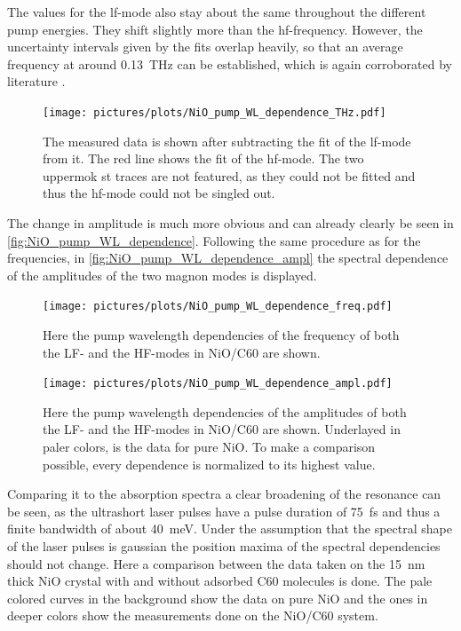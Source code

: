 The values for the lf-mode also stay about the same throughout the different pump energies.
They shift slightly more than the hf-frequency.
However, the uncertainty intervals given by the fits overlap heavily, so that an average frequency at around \qty{0.13}{THz} can be established, which is again corroborated by literature .
\begin{figure}[ht]
    \centering
    \texttt{[image: pictures/plots/NiO\_pump\_WL\_dependence\_THz.pdf]}
    \caption{The measured data is shown after subtracting the fit of the lf-mode from it. The red line shows the fit of the hf-mode. The two uppermok  st traces are not featured, as they could not be fitted and thus the hf-mode could not be singled out.}
    \label{fig:NiO_pump_WL_dependence_THz}
\end{figure}
\FloatBarrier
The change in amplitude is much more obvious and can already clearly be seen in \autoref{fig:NiO_pump_WL_dependence}.
Following the same procedure as for the frequencies, in \autoref{fig:NiO_pump_WL_dependence_ampl} the spectral dependence of the amplitudes of the two magnon modes is displayed.
\begin{figure}[ht]
    \centering
    \texttt{[image: pictures/plots/NiO\_pump\_WL\_dependence\_freq.pdf]}
    \caption{Here the pump wavelength dependencies of the frequency of both the LF- and the HF-modes in NiO/C60 are shown.}
    \label{fig:NiO_pump_WL_dependence_freq}
\end{figure}
\begin{figure}[ht]
    \centering
    \texttt{[image: pictures/plots/NiO\_pump\_WL\_dependence\_ampl.pdf]}
    \caption{Here the pump wavelength dependencies of the amplitudes of both the LF- and the HF-modes in NiO/C60 are shown. Underlayed in paler colors, is the data for pure NiO. To make a comparison possible, every dependence is normalized to its highest value.}
    \label{fig:NiO_pump_WL_dependence_ampl}
\end{figure}
\FloatBarrier
Comparing it to the absorption spectra a clear broadening of the resonance can be seen, as the ultrashort laser pulses have a pulse duration of \qty{75}{fs} and thus a finite bandwidth of about \qty{40}{meV}.
Under the assumption that the spectral shape of the laser pulses is gaussian the position maxima of the spectral dependencies should not change.
Here a comparison between the data taken on the \qty{15}{nm} thick NiO crystal with and without adsorbed C60 molecules is done.
The pale colored curves in the background show the data on pure NiO and the ones in deeper colors show the measurements done on the NiO/C60 system.
